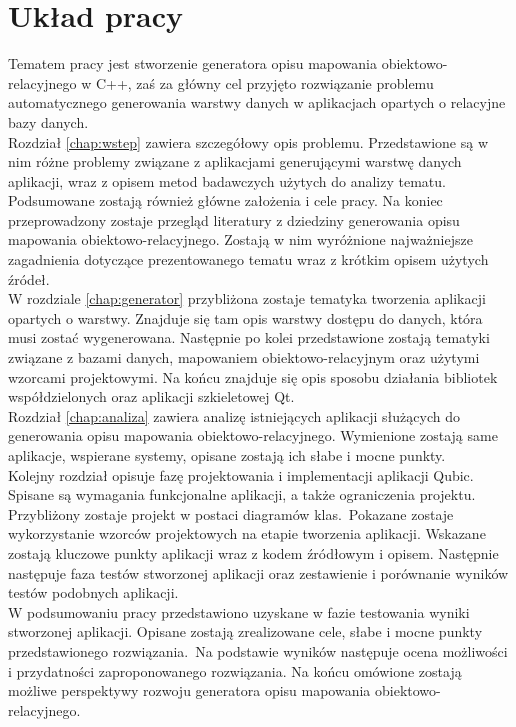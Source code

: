 \documentclass[12pt]{report}
\begin{document}
\section{Układ pracy}
Tematem pracy jest stworzenie generatora opisu mapowania obiektowo-relacyjnego w C++, zaś za główny cel przyjęto rozwiązanie problemu
automatycznego generowania warstwy danych w aplikacjach opartych o relacyjne bazy danych. \\
Rozdział \ref{chap:wstep} zawiera szczegółowy opis problemu. {\color{black} Przedstawione są w nim różne problemy związane z aplikacjami generującymi warstwę danych aplikacji},
wraz z opisem metod badawczych użytych do analizy tematu. Podsumowane zostają również główne założenia i cele pracy.
Na koniec przeprowadzony zostaje przegląd literatury z dziedziny generowania opisu mapowania obiektowo-relacyjnego. Zostają w nim wyróżnione
najważniejsze {\color{black} zagadnienia} dotyczące prezentowanego tematu wraz z krótkim opisem użytych źródeł.  \\
W rozdziale \ref{chap:generator} przybliżona zostaje tematyka tworzenia aplikacji opartych o warstwy. Znajduje się tam opis warstwy dostępu do danych, która musi zostać wygenerowana. Następnie po kolei przedstawione zostają tematyki związane z bazami danych, mapowaniem obiektowo-relacyjnym oraz użytymi wzorcami projektowymi. Na końcu znajduje się opis sposobu działania bibliotek współdzielonych oraz aplikacji szkieletowej Qt. \\
Rozdział \ref{chap:analiza} zawiera analizę istniejących aplikacji służących do generowania opisu mapowania obiektowo-relacyjnego. Wymienione zostają same aplikacje, wspierane systemy, opisane zostają ich słabe i mocne punkty. \\
Kolejny rozdział opisuje fazę projektowania i implementacji aplikacji Qubic. Spisane są wymagania funkcjonalne aplikacji, a także ograniczenia projektu. Przybliżony zostaje projekt w postaci diagramów klas.\ Pokazane zostaje wykorzystanie wzorców projektowych na etapie tworzenia aplikacji. Wskazane zostają kluczowe punkty aplikacji wraz z kodem źródłowym i opisem. Następnie następuje faza testów stworzonej aplikacji oraz zestawienie i porównanie wyników testów podobnych aplikacji. \\
W podsumowaniu pracy przedstawiono uzyskane w fazie testowania wyniki stworzonej aplikacji. Opisane zostają zrealizowane cele, słabe i mocne punkty przedstawionego rozwiązania.\ Na podstawie wyników następuje ocena możliwości i przydatności zaproponowanego rozwiązania. Na końcu omówione zostają możliwe perspektywy rozwoju generatora opisu mapowania obiektowo-relacyjnego.
\end{document}
